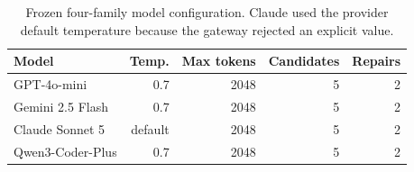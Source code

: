 \begin{table}[t]
\centering
\small
\caption{Frozen four-family model configuration. Claude used the provider default temperature because the gateway rejected an explicit value.}
\label{tab:model_config_final}
\begin{tabular}{lrrrr}
\toprule
Model & Temp. & Max tokens & Candidates & Repairs \\
\midrule
GPT-4o-mini & 0.7 & 2048 & 5 & 2 \\
Gemini 2.5 Flash & 0.7 & 2048 & 5 & 2 \\
Claude Sonnet 5 & default & 2048 & 5 & 2 \\
Qwen3-Coder-Plus & 0.7 & 2048 & 5 & 2 \\
\bottomrule
\end{tabular}
\end{table}
